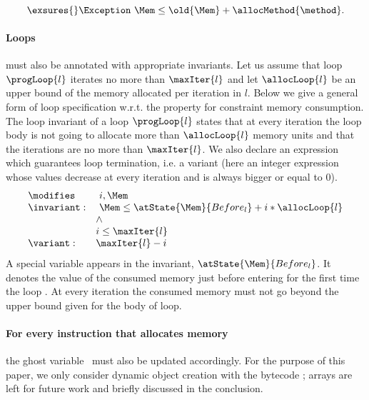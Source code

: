 $$
\exsures{} \Exception \  \Mem \leq \old{\Mem} + \allocMethod{\method}.
$$


\paragraph{Loops} must also be annotated with appropriate invariants. 
Let us assume that loop $\progLoop{l}$ iterates no more than $\maxIter{l}$ and let $\allocLoop{l}$ be an upper bound of the memory allocated per iteration in $l$.
Below we give a general form of loop specification w.r.t. the property for constraint memory consumption. The loop invariant of a loop $\progLoop{l}$ states that at every iteration the loop body is not going to allocate more than $\allocLoop{l}$ memory units and that the iterations are no more than $\maxIter{l}$. We also declare an expression which guarantees loop termination, i.e. a variant (here an integer expression whose values decrease at every iteration  and is always bigger or equal to 0).
$$\begin{array}{ll}
\modifies &  \ i, \Mem \\
\invariant: & \ \Mem \le \atState{\Mem}{Before_{l}} + i * \allocLoop{l} \\
                & \wedge \\
                & i \le \maxIter{l}\\
\variant: & \maxIter{l} - i \\
\end{array}$$
 A special variable appears in the invariant, $\atState{\Mem}{Before_{l}}$. It denotes the value of the consumed memory just before entering for the first time the loop . At every iteration the consumed memory must not go beyond the upper bound given for the body of loop.

\paragraph{For every instruction that allocates memory} the ghost
variable \Mem\ must also be updated accordingly. For the purpose of
this paper, we only consider dynamic object creation with the bytecode
\new; arrays are left for future work and briefly discussed in the
conclusion. 

